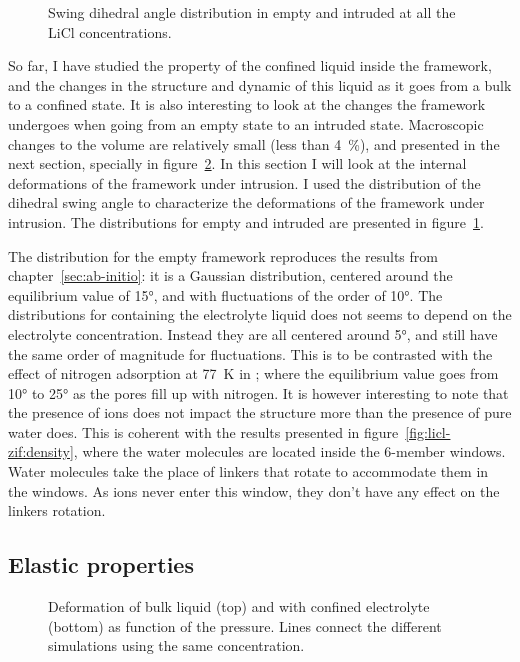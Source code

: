 \documentclass[thesis]{subfiles}
\begin{document}
\begin{figure}[ht]
    \centering
    
    \caption{Swing dihedral angle distribution in empty and intruded  at
    all the LiCl concentrations.}
    \label{fig:licl-zif:dihedrals}
\end{figure}

So far, I have studied the property of the confined liquid inside the 
framework, and the changes in the structure and dynamic of this liquid as it
goes from a bulk to a confined state. It is also interesting to look at the
changes the framework undergoes when going from an empty state to an intruded
state. Macroscopic changes to the volume are relatively small (less than 4~\%),
and presented in the next section, specially in figure~\ref{fig:licl-zif:pv}. In
this section I will look at the internal deformations of the framework under
intrusion. I used the distribution of the  dihedral swing angle
to characterize the deformations of the framework under intrusion. The
distributions for empty and intruded  are presented in
figure~\ref{fig:licl-zif:dihedrals}.

The distribution for the empty framework reproduces the results from
chapter~\ref{sec:ab-initio}: it is a Gaussian distribution, centered around the
equilibrium value of 15°, and with fluctuations of the order of 10°. The
distributions for  containing the electrolyte liquid does not seems to
depend on the electrolyte concentration. Instead they are all centered around
5°, and still have the same order of magnitude for fluctuations. This is to be
contrasted with the effect of nitrogen adsorption at \SI{77}{K} in ; where
the equilibrium value goes from 10° to 25° as the pores fill up with nitrogen.
It is however interesting to note that the presence of ions does not impact the
structure more than the presence of pure water does. This is coherent with the
results presented in figure~\ref{fig:licl-zif:density}, where the water
molecules are located inside the 6-member windows. Water molecules take the
place of linkers that rotate to accommodate them in the windows. As ions never
enter this window, they don't have any effect on the linkers rotation.

\subsection{Elastic properties}

\begin{figure}[ht]
    \centering
    
    \caption{Deformation of bulk liquid (top) and  with confined electrolyte
    (bottom) as function of the pressure. Lines connect the different simulations
    using the same concentration.}
    \label{fig:licl-zif:pv}
\end{figure}
\end{document}
